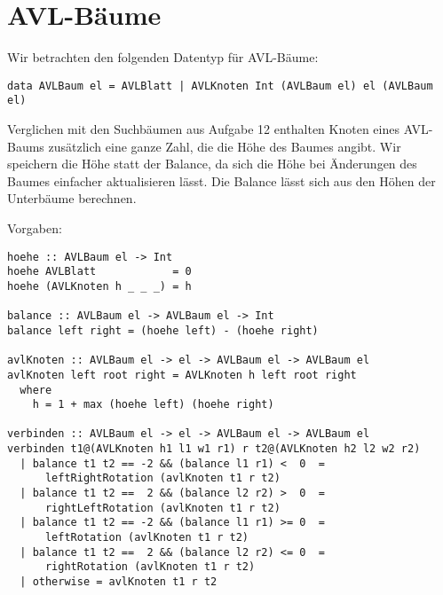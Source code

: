 \documentclass[
  10pt,                   %
  DIV12,
  german,                 %
  oneside,                %
  parskip=half,           %
  headings=normal,        %
  captions=tableheading,  %
]{scrartcl}
\begin{document}
\section{AVL-Bäume}
Wir betrachten den folgenden Datentyp für AVL-Bäume:
\begin{center}
\lstinline!data AVLBaum el = AVLBlatt | AVLKnoten Int (AVLBaum el) el (AVLBaum el)!
\end{center}
Verglichen mit den Suchbäumen aus Aufgabe 12 enthalten Knoten eines AVL-Baums zusätzlich eine ganze Zahl, die die Höhe des Baumes angibt. Wir speichern die Höhe statt der Balance, da sich die Höhe bei Änderungen des Baumes einfacher aktualisieren lässt. Die Balance lässt sich aus den Höhen der Unterbäume berechnen.

Vorgaben:

\begin{lstlisting}
hoehe :: AVLBaum el -> Int
hoehe AVLBlatt            = 0
hoehe (AVLKnoten h _ _ _) = h

balance :: AVLBaum el -> AVLBaum el -> Int
balance left right = (hoehe left) - (hoehe right)

avlKnoten :: AVLBaum el -> el -> AVLBaum el -> AVLBaum el
avlKnoten left root right = AVLKnoten h left root right
  where
    h = 1 + max (hoehe left) (hoehe right)
    
verbinden :: AVLBaum el -> el -> AVLBaum el -> AVLBaum el
verbinden t1@(AVLKnoten h1 l1 w1 r1) r t2@(AVLKnoten h2 l2 w2 r2) 
  | balance t1 t2 == -2 && (balance l1 r1) <  0  = 
      leftRightRotation (avlKnoten t1 r t2)
  | balance t1 t2 ==  2 && (balance l2 r2) >  0  = 
      rightLeftRotation (avlKnoten t1 r t2)
  | balance t1 t2 == -2 && (balance l1 r1) >= 0  = 
      leftRotation (avlKnoten t1 r t2)
  | balance t1 t2 ==  2 && (balance l2 r2) <= 0  = 
      rightRotation (avlKnoten t1 r t2)
  | otherwise = avlKnoten t1 r t2
\end{lstlisting}
\end{document}
